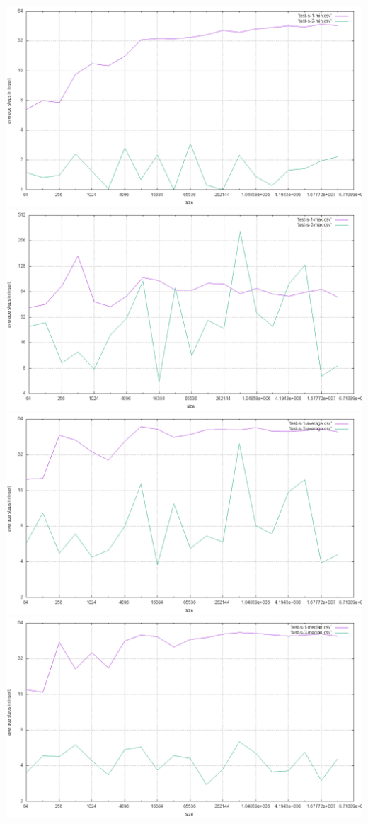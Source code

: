 \documentclass[12pt,a4paper]{report}
\begin{document}
\includegraphics[width=\textwidth]{./tests/sequence_test/uniform-test1.png}
\includegraphics[width=\textwidth]{./tests/sequence_test/uniform-test2.png}
\includegraphics[width=\textwidth]{./tests/sequence_test/uniform-test3.png}
\includegraphics[width=\textwidth]{./tests/sequence_test/uniform-test4.png}
\end{document}
